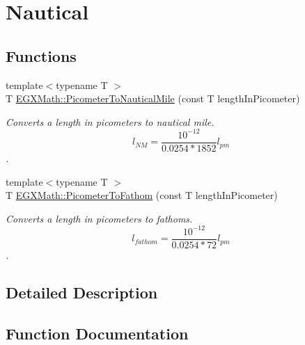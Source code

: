 \hypertarget{group___e_g_x_math-_conversions-_length_conversions-_s_i-_picometer-_nautical}{}\section{Nautical}
\label{group___e_g_x_math-_conversions-_length_conversions-_s_i-_picometer-_nautical}
\subsection*{Functions}
\begin{DoxyCompactItemize}
\item 
{\footnotesize template$<$typename T $>$ }\\T \mbox{\hyperlink{group___e_g_x_math-_conversions-_length_conversions-_s_i-_picometer-_nautical_ga7127ef6c7c68736b7a24d2c65b8ac858}{E\+G\+X\+Math\+::\+Picometer\+To\+Nautical\+Mile}} (const T length\+In\+Picometer)
\begin{DoxyCompactList}\small\item\em Converts a length in picometers to nautical mile. \[ l_{NM}= \frac{10^{-12}}{0.0254 * 1852} l_{pm} \]. \end{DoxyCompactList}\item 
{\footnotesize template$<$typename T $>$ }\\T \mbox{\hyperlink{group___e_g_x_math-_conversions-_length_conversions-_s_i-_picometer-_nautical_ga1d8f092a0b6d47c4eaac5d9d19512d84}{E\+G\+X\+Math\+::\+Picometer\+To\+Fathom}} (const T length\+In\+Picometer)
\begin{DoxyCompactList}\small\item\em Converts a length in picometers to fathoms. \[ l_{fathom}= \frac{10^{-12}}{0.0254 * 72} l_{pm} \]. \end{DoxyCompactList}\end{DoxyCompactItemize}


\subsection{Detailed Description}


\subsection{Function Documentation}
\mbox{\label{group___e_g_x_math-_conversions-_length_conversions-_s_i-_picometer-_nautical_ga1d8f092a0b6d47c4eaac5d9d19512d84}} 
